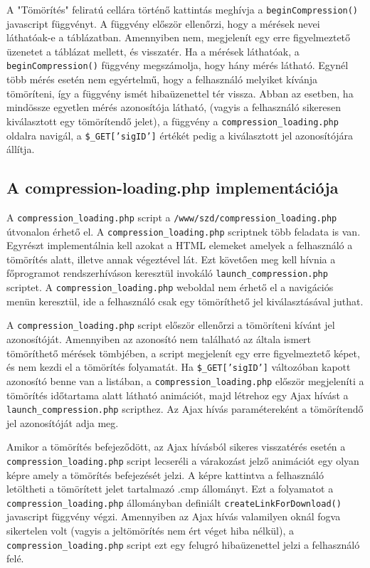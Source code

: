 \documentclass[oneside,titlepage,12pt,a4paper]{report}
\begin{document}
\par A "Tömörítés" feliratú cellára történő kattintás meghívja a \texttt{beginCompression()} javascript függvényt. A függvény először ellenőrzi, hogy a mérések nevei láthatóak-e a táblázatban. Amennyiben nem, megjelenít egy erre figyelmeztető üzenetet a táblázat mellett, és visszatér. Ha a mérések láthatóak, a \texttt{beginCompression()} függvény megszámolja, hogy hány mérés látható. Egynél több mérés esetén nem egyértelmű, hogy a felhasználó melyiket kívánja tömöríteni, így a függvény ismét hibaüzenettel tér vissza. Abban az esetben, ha mindössze egyetlen mérés azonosítója látható, (vagyis a felhasználó sikeresen kiválasztott egy tömörítendő jelet), a függvény a \texttt{compression\_loading.php} oldalra navigál, a \texttt{\$\_GET['sigID']} értékét pedig a kiválasztott jel azonosítójára állítja.   

\subsection{A compression-loading.php implementációja}

A \texttt{compression\_loading.php} script a \texttt{/www/szd/compression\_loading.php} útvonalon érhető el. A \texttt{compression\_loading.php} scriptnek több feladata is van. Egyrészt implementálnia kell azokat a HTML elemeket amelyek a felhasználó a tömörítés alatt, illetve annak végeztével lát. Ezt követően meg kell hívnia a főprogramot \linebreak rendszerhíváson keresztül invokáló \texttt{launch\_compression.php} scriptet. \linebreak A \texttt{compression\_loading.php} weboldal nem érhető el a navigációs menün keresztül, ide a felhasználó csak egy tömöríthető jel kiválasztásával juthat. 
\par A \texttt{compression\_loading.php} script először ellenőrzi a tömöríteni kívánt jel azonosítóját. Amennyiben az azonosító nem található az általa ismert tömöríthető mérések tömbjében, a script megjelenít egy erre figyelmeztető képet, és nem kezdi el a tömörítés folyamatát. Ha \texttt{\$\_GET['sigID']} változóban kapott azonosító benne van a listában, a \texttt{compression\_loading.php} először megjeleníti a tömörítés időtartama alatt látható animációt, majd létrehoz egy Ajax hívást a \texttt{launch\_compression.php} scripthez. Az Ajax hívás paramétereként a tömörítendő jel azonosítóját adja meg. 
\par Amikor a tömörítés befejeződött, az Ajax hívásból sikeres visszatérés esetén a \texttt{compression\_loading.php} script lecseréli a várakozást jelző animációt egy olyan képre amely a tömörítés befejezését jelzi. A képre kattintva a felhasználó letöltheti a tömörített jelet tartalmazó .cmp állományt. Ezt a folyamatot a \texttt{compression\_loading.php} állományban definiált \texttt{createLinkForDownload()} javascript függvény végzi. Amennyiben az Ajax hívás valamilyen oknál fogva sikertelen volt (vagyis a jeltömörítés nem ért véget hiba nélkül), a \texttt{compression\_loading.php} script ezt egy felugró hibaüzenettel jelzi a felhasználó felé.
\end{document}
